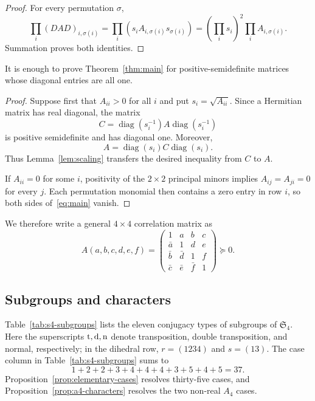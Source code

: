 \documentclass[10pt,twoside]{siamart1116}
\newcommand{\Sn}{\mathfrak S}
\newcommand{\diag}{\operatorname{diag}}
\newcommand{\mat}[1]{\begin{pmatrix}#1\end{pmatrix}}
\newcommand{\psd}{\succeq 0}
\begin{document}
\begin{proof}
For every permutation $\sigma$,
\[
 \prod_i(DAD)_{i,\sigma(i)}
 =\prod_i(s_iA_{i,\sigma(i)}s_{\sigma(i)})
 =\left(\prod_i s_i\right)^2\prod_iA_{i,\sigma(i)}.
\]
Summation proves both identities.
\end{proof}

\begin{lemma}\label{lem:correlation-reduction}
It is enough to prove Theorem~\ref{thm:main} for positive-semidefinite
matrices whose diagonal entries are all one.
\end{lemma}

\begin{proof}
Suppose first that $A_{ii}>0$ for all $i$ and put
$s_i=\sqrt{A_{ii}}$.  Since a Hermitian matrix has real diagonal, the matrix
\[
 C=\diag(s_i^{-1})A\diag(s_i^{-1})
\]
is positive semidefinite and has diagonal one.  Moreover,
\[
 A=\diag(s_i)C\diag(s_i).
\]
Thus Lemma~\ref{lem:scaling} transfers the desired inequality from $C$ to
$A$.

If $A_{ii}=0$ for some $i$, positivity of the $2\times2$ principal minors
implies $A_{ij}=A_{ji}=0$ for every $j$.  Each permutation monomial then
contains a zero entry in row $i$, so both sides of~\eqref{eq:main} vanish.
\end{proof}

We therefore write a general $4\times4$ correlation matrix as
\begin{equation}\label{eq:corr-six}
 A(a,b,c,d,e,f)=
 \mat{
 1&a&b&c\\
 \bar a&1&d&e\\
 \bar b&\bar d&1&f\\
 \bar c&\bar e&\bar f&1
 }\psd.
\end{equation}

\subsection{Subgroups and characters}\label{sec:finite-reduction}

Table~\ref{tab:s4-subgroups} lists the eleven conjugacy types of subgroups of
$\Sn_4$.
Here the superscripts ${\rm t},{\rm d},{\rm n}$ denote transposition,
double transposition, and normal, respectively; in the dihedral row,
$r=(1234)$ and $s=(13)$.
The case column in Table~\ref{tab:s4-subgroups} sums to
\[
 1+2+2+3+4+4+4+3+5+4+5=37.
\]
Proposition~\ref{prop:elementary-cases} resolves thirty-five cases, and
Proposition~\ref{prop:a4-characters} resolves the two non-real $A_4$ cases.
\end{document}
